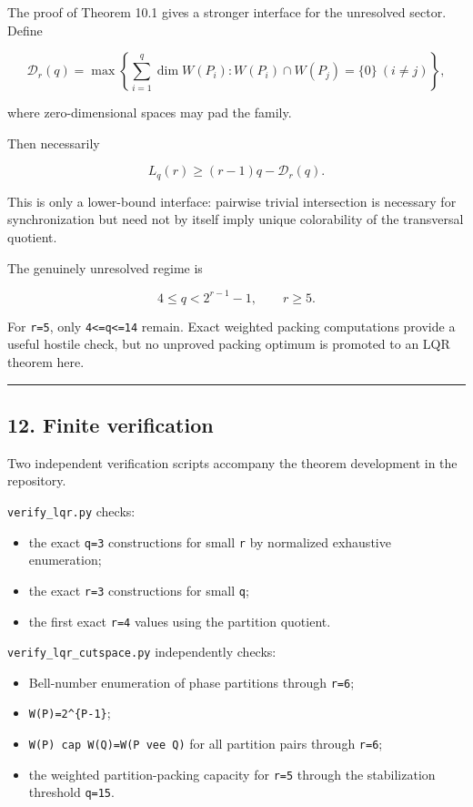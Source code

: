The proof of Theorem 10.1 gives a stronger interface for the unresolved
sector. Define

\[
\mathcal D_r(q)
=
\max\left\{
\sum_{i=1}^q\dim W(P_i):
W(P_i)\cap W(P_j)=\{0\}\ (i\ne j)
\right\},
\tag{58}
\]

where zero-dimensional spaces may pad the family.

Then necessarily

\[
L_q(r)\ge(r-1)q-\mathcal D_r(q).
\tag{59}
\]

This is only a lower-bound interface: pairwise trivial intersection is
necessary for synchronization but need not by itself imply unique
colorability of the transversal quotient.

The genuinely unresolved regime is

\[
\boxed{
4\le q<2^{r-1}-1,
\qquad r\ge5.
}
\tag{60}
\]

For \texttt{r=5}, only \texttt{4\textless{}=q\textless{}=14} remain.
Exact weighted packing computations provide a useful hostile check, but
no unproved packing optimum is promoted to an LQR theorem here.

\begin{center}\rule{0.5\linewidth}{0.5pt}\end{center}

\hypertarget{finite-verification}{%
\subsection{12. Finite verification}\label{finite-verification}}

Two independent verification scripts accompany the theorem development
in the repository.

\texttt{verify\_lqr.py} checks:

\begin{itemize}
\tightlist
\item
  the exact \texttt{q=3} constructions for small \texttt{r} by
  normalized exhaustive enumeration;
\item
  the exact \texttt{r=3} constructions for small \texttt{q};
\item
  the first exact \texttt{r=4} values using the partition quotient.
\end{itemize}

\texttt{verify\_lqr\_cutspace.py} independently checks:

\begin{itemize}
\tightlist
\item
  Bell-number enumeration of phase partitions through \texttt{r=6};
\item
  \texttt{\textbar{}W(P)\textbar{}=2\^{}\{\textbar{}P\textbar{}-1\}};
\item
  \texttt{W(P)\ cap\ W(Q)=W(P\ vee\ Q)} for all partition pairs through
  \texttt{r=6};
\item
  the weighted partition-packing capacity for \texttt{r=5} through the
  stabilization threshold \texttt{q=15}.
\end{itemize}

